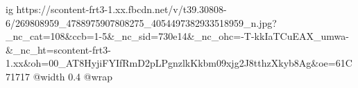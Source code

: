  
 
 
 
 

\ifcmt
  ig https://scontent-frt3-1.xx.fbcdn.net/v/t39.30808-6/269808959_4788975907808275_4054497382933518959_n.jpg?_nc_cat=108&ccb=1-5&_nc_sid=730e14&_nc_ohc=-T-kkIaTCuEAX_umwa-&_nc_ht=scontent-frt3-1.xx&oh=00_AT8HyjiFYIfRmD2pLPgnzlkKkbm09xjg2J8tthzXkyb8Ag&oe=61C71717
  @width 0.4
  @wrap 
\fi
